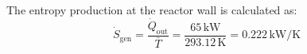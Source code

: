 The entropy production at the reactor wall is calculated as:  
\[
\dot{S}_{\text{gen}} = \frac{\dot{Q}_{\text{out}}}{\bar{T}} = \frac{65 \, \text{kW}}{293.12 \, \text{K}} = 0.222 \, \text{kW/K}
\]